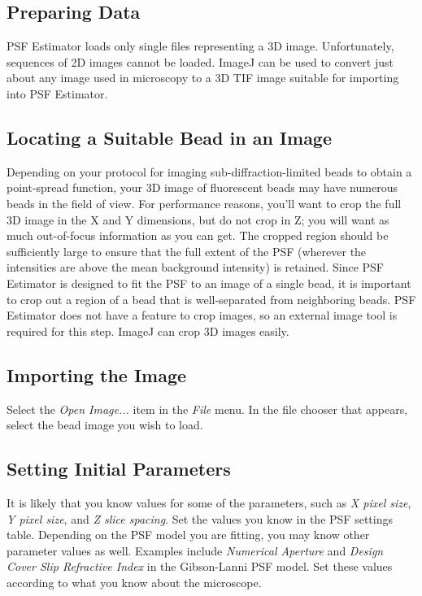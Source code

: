 \documentclass[11pt,titlepage,twoside]{article}
\begin{document}
\subsection{Preparing Data}

PSF Estimator loads only single files representing a 3D image. Unfortunately, sequences of 2D images cannot be loaded. ImageJ can be used to convert just about any image used in microscopy to a 3D TIF image suitable for importing into PSF Estimator.

\subsection{Locating a Suitable Bead in an Image}

Depending on your protocol for imaging sub-diffraction-limited beads to obtain a point-spread function, your 3D image of fluorescent beads may have numerous beads in the field of view. For performance reasons, you'll want to crop the full 3D image in the X and Y dimensions, but do not crop in Z; you will want as much out-of-focus information as you can get. The cropped region should be sufficiently large to ensure that the full extent of the PSF (wherever the intensities are above the mean background intensity) is retained. Since PSF Estimator is designed to fit the PSF to an image of a single bead, it is important to crop out a region of a bead that is well-separated from neighboring beads. PSF Estimator does not have a feature to crop images, so an external image tool is required for this step. ImageJ can crop 3D images easily.

\subsection{Importing the Image}

Select the \emph{Open Image...} item in the \emph{File} menu. In the file chooser that appears, select the bead image you wish to load.

\subsection{Setting Initial Parameters}

It is likely that you know values for some of the parameters, such as \emph{X pixel size}, \emph{Y pixel size}, and \emph{Z slice spacing}. Set the values you know in the PSF settings table. Depending on the PSF model you are fitting, you may know other parameter values as well. Examples include \emph{Numerical Aperture} and \emph{Design Cover Slip Refractive Index} in the Gibson-Lanni PSF model. Set these values according to what you know about the microscope.
\end{document}
